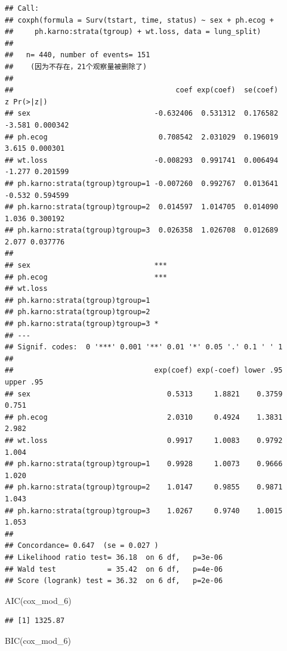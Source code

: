 \documentclass[
]{article}
\newenvironment{Shaded}{\begin{snugshade}}{\end{snugshade}}
\newcommand{\FunctionTok}[1]{\textcolor[rgb]{0.00,0.00,0.00}{#1}}
\newcommand{\NormalTok}[1]{#1}
\begin{document}
\begin{verbatim}
## Call:
## coxph(formula = Surv(tstart, time, status) ~ sex + ph.ecog + 
##     ph.karno:strata(tgroup) + wt.loss, data = lung_split)
## 
##   n= 440, number of events= 151 
##    (因为不存在，21个观察量被删除了)
## 
##                                      coef exp(coef)  se(coef)      z Pr(>|z|)
## sex                             -0.632406  0.531312  0.176582 -3.581 0.000342
## ph.ecog                          0.708542  2.031029  0.196019  3.615 0.000301
## wt.loss                         -0.008293  0.991741  0.006494 -1.277 0.201599
## ph.karno:strata(tgroup)tgroup=1 -0.007260  0.992767  0.013641 -0.532 0.594599
## ph.karno:strata(tgroup)tgroup=2  0.014597  1.014705  0.014090  1.036 0.300192
## ph.karno:strata(tgroup)tgroup=3  0.026358  1.026708  0.012689  2.077 0.037776
##                                    
## sex                             ***
## ph.ecog                         ***
## wt.loss                            
## ph.karno:strata(tgroup)tgroup=1    
## ph.karno:strata(tgroup)tgroup=2    
## ph.karno:strata(tgroup)tgroup=3 *  
## ---
## Signif. codes:  0 '***' 0.001 '**' 0.01 '*' 0.05 '.' 0.1 ' ' 1
## 
##                                 exp(coef) exp(-coef) lower .95 upper .95
## sex                                0.5313     1.8821    0.3759     0.751
## ph.ecog                            2.0310     0.4924    1.3831     2.982
## wt.loss                            0.9917     1.0083    0.9792     1.004
## ph.karno:strata(tgroup)tgroup=1    0.9928     1.0073    0.9666     1.020
## ph.karno:strata(tgroup)tgroup=2    1.0147     0.9855    0.9871     1.043
## ph.karno:strata(tgroup)tgroup=3    1.0267     0.9740    1.0015     1.053
## 
## Concordance= 0.647  (se = 0.027 )
## Likelihood ratio test= 36.18  on 6 df,   p=3e-06
## Wald test            = 35.42  on 6 df,   p=4e-06
## Score (logrank) test = 36.32  on 6 df,   p=2e-06
\end{verbatim}

\begin{Shaded}
\begin{Highlighting}[]
\FunctionTok{AIC}\NormalTok{(cox\_mod\_6)}
\end{Highlighting}
\end{Shaded}

\begin{verbatim}
## [1] 1325.87
\end{verbatim}

\begin{Shaded}
\begin{Highlighting}[]
\FunctionTok{BIC}\NormalTok{(cox\_mod\_6)}
\end{Highlighting}
\end{Shaded}
\end{document}
